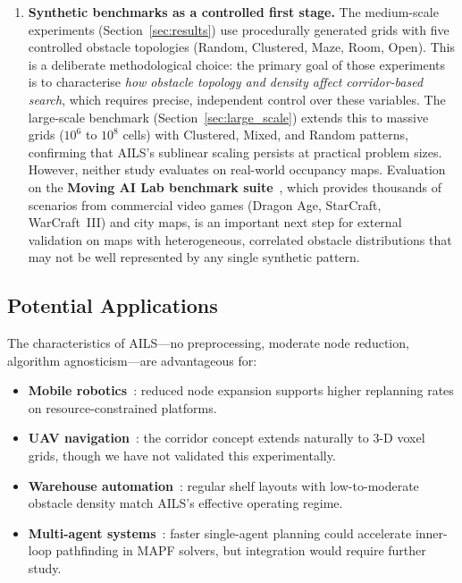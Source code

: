 \documentclass[journal]{IEEEtran}
\begin{document}
\begin{enumerate}
    \item \textbf{Synthetic benchmarks as a controlled first stage.}
    The medium-scale experiments (Section~\ref{sec:results}) use procedurally generated grids with five controlled obstacle topologies (Random, Clustered, Maze, Room, Open).
    This is a deliberate methodological choice: the primary goal of those experiments is to characterise \emph{how obstacle topology and density affect corridor-based search}, which requires precise, independent control over these variables.
    The large-scale benchmark (Section~\ref{sec:large_scale}) extends this to massive grids ($10^6$ to $10^8$ cells) with Clustered, Mixed, and Random patterns, confirming that AILS's sublinear scaling persists at practical problem sizes.
    However, neither study evaluates on real-world occupancy maps.
    Evaluation on the \textbf{Moving AI Lab benchmark suite}~\cite{sturtevant2012benchmarks,sturtevant2023benchmarking}, which provides thousands of scenarios from commercial video games (Dragon Age, StarCraft, WarCraft~III) and city maps, is an important next step for external validation on maps with heterogeneous, correlated obstacle distributions that may not be well represented by any single synthetic pattern.
\end{enumerate}

\subsection{Potential Applications}

The characteristics of AILS---no preprocessing, moderate node reduction, algorithm agnosticism---are advantageous for:
\begin{itemize}
    \item \textbf{Mobile robotics}~\cite{siciliano2016springer,bento2021autonomous}: reduced node expansion supports higher replanning rates on resource-constrained platforms.
    \item \textbf{UAV navigation}~\cite{goerzen2010survey,majeed2024uav,gao2024drone}: the corridor concept extends naturally to 3-D voxel grids, though we have not validated this experimentally.
    \item \textbf{Warehouse automation}~\cite{wu2020warehouse,lin2023warehouse}: regular shelf layouts with low-to-moderate obstacle density match AILS's effective operating regime.
    \item \textbf{Multi-agent systems}~\cite{stern2019mapf}: faster single-agent planning could accelerate inner-loop pathfinding in MAPF solvers, but integration would require further study.
\end{itemize}
\end{document}
